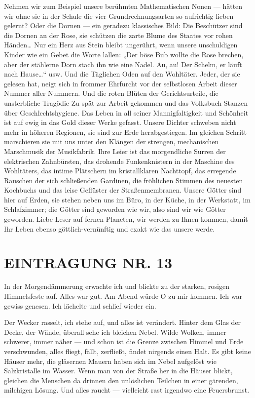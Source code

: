 Nehmen wir zum Beispiel unsere berühmten Mathematischen Nonen —
hätten wir ohne sie in der Schule die vier Grundrechnungsarten so
aufrichtig lieben gelernt? Oder die Dornen — ein geradezu
klassisches Bild: Die Beschützer sind die Dornen an der Rose, sie
schützen die zarte Blume des Staates vor rohen Händen\ldots{} Nur ein
Herz aus Stein bleibt ungerührt, wenn unsere unschuldigen Kinder
wie ein Gebet die Worte lallen: „Der böse Bub wollte die Rose
brechen, aber der stählerne Dorn stach ihn wie eine Nadel. Au, au!
Der Schelm, er läuft nach Hause\ldots{}“ usw. Und die Täglichen Oden auf
den Wohltäter. Jeder, der sie gelesen hat, neigt sich in frommer
Ehrfurcht vor der selbstlosen Arbeit dieser Nummer aller Nummern.
Und die roten Blüten der Gerichtsurteile, die unsterbliche Tragödie
Zu spät zur Arbeit gekommen und das Volksbuch Stanzen über
Geschlechtshygiene. Das Leben in all seiner Mannigfaltigkeit und
Schönheit ist auf ewig in das Gold dieser Werke gefasst. Unsere
Dichter schweben nicht mehr in höheren Regionen, sie sind zur Erde
herabgestiegen. Im gleichen Schritt marschieren sie mit uns unter
den Klängen der strengen, mechanischen Marschmusik der Musikfabrik.
Ihre Leier ist das morgendliche Surren der elektrischen
Zahnbürsten, das drohende Funkenknistern in der Maschine des
Wohltäters, das intime Plätschern im kristallklaren Nachttopf, das
erregende Rauschen der sich schließenden Gardinen, die fröhlichen
Stimmen des neuesten Kochbuchs und das leise Geflüster der
Straßenmembranen. Unsere Götter sind hier auf Erden, sie stehen
neben uns im Büro, in der Küche, in der Werkstatt, im Schlafzimmer;
die Götter sind geworden wie wir, also sind wir wie Götter
geworden. Liebe Leser auf fernen Planeten, wir werden zu Ihnen
kommen, damit Ihr Leben ebenso göttlich-vernünftig und exakt wie
das unsere werde.

\section{EINTRAGUNG NR. 13}

In der Morgendämmerung erwachte ich und blickte zu der starken,
rosigen Himmelsfeste auf. Alles war gut. Am Abend würde O zu mir
kommen. Ich war gewiss genesen. Ich lächelte und schlief wieder
ein.

Der Wecker rasselt, ich stehe auf, und alles ist verändert. Hinter
dem Glas der Decke, der Wände, überall sehe ich bleichen Nebel.
Wilde Wolken, immer schwerer, immer
näher — und schon ist die Grenze zwischen Himmel und Erde
verschwunden, alles fliegt, fällt, zerfließt, findet nirgends einen
Halt. Es gibt keine Häuser mehr, die gläsernen Mauern haben sich im
Nebel aufgelöst wie Salzkristalle im Wasser. Wenn man von der
Straße her in die Häuser blickt, gleichen die Menschen da drinnen
den unlöslichen Teilchen in einer gärenden, milchigen Lösung. Und
alles raucht — vielleicht rast irgendwo eine Feuersbrunst.

